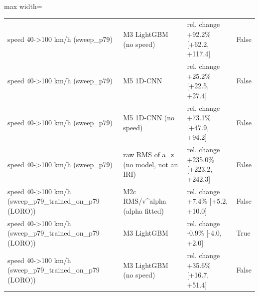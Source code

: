 \begin{table}[!htbp]
\begin{adjustbox}{max width=\columnwidth}
\begin{tabular}{>{\raggedright\arraybackslash}p{4.3cm}>{\raggedright\arraybackslash}p{4.3cm}>{\raggedright\arraybackslash}p{6.4cm}l}
speed 40-\textgreater{}100 km/h (sweep\_p79) & M3 LightGBM (no speed) & rel. change +92.2\% [+62.2, +117.4] & False \\
speed 40-\textgreater{}100 km/h (sweep\_p79) & M5 1D-CNN & rel. change +25.2\% [+22.5, +27.4] & False \\
speed 40-\textgreater{}100 km/h (sweep\_p79) & M5 1D-CNN (no speed) & rel. change +73.1\% [+47.9, +94.2] & False \\
speed 40-\textgreater{}100 km/h (sweep\_p79) & raw RMS of a\_z (no model, not an IRI) & rel. change +235.0\% [+223.2, +242.3] & False \\
speed 40-\textgreater{}100 km/h (sweep\_p79\_trained\_on\_p79 (LORO)) & M2c RMS/v\textasciicircum{}alpha (alpha fitted) & rel. change +7.4\% [+5.2, +10.0] & False \\
speed 40-\textgreater{}100 km/h (sweep\_p79\_trained\_on\_p79 (LORO)) & M3 LightGBM & rel. change -0.9\% [-4.0, +2.0] & True \\
speed 40-\textgreater{}100 km/h (sweep\_p79\_trained\_on\_p79 (LORO)) & M3 LightGBM (no speed) & rel. change +35.6\% [+16.7, +51.4] & False \\
\bottomrule
\end{tabular}
\end{adjustbox}
\end{table}
